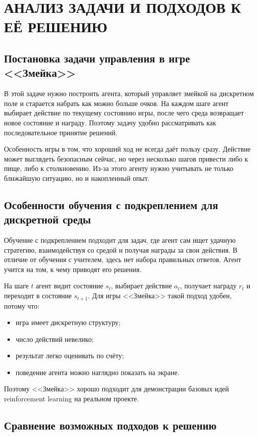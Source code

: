 \chapter{АНАЛИЗ ЗАДАЧИ И ПОДХОДОВ К ЕЁ РЕШЕНИЮ}

\section{Постановка задачи управления в игре <<Змейка>>}

В этой задаче нужно построить агента, который управляет змейкой на дискретном поле и старается набрать как можно больше очков. На каждом шаге агент выбирает действие по текущему состоянию игры, после чего среда возвращает новое состояние и награду. Поэтому задачу удобно рассматривать как последовательное принятие решений.

Особенность игры в том, что хороший ход не всегда даёт пользу сразу. Действие может выглядеть безопасным сейчас, но через несколько шагов привести либо к пище, либо к столкновению. Из-за этого агенту нужно учитывать не только ближайшую ситуацию, но и накопленный опыт.

\section{Особенности обучения с подкреплением для дискретной среды}

Обучение с подкреплением подходит для задач, где агент сам ищет удачную стратегию, взаимодействуя со средой и получая награды за свои действия. В отличие от обучения с учителем, здесь нет набора правильных ответов. Агент учится на том, к чему приводят его решения.

На шаге $t$ агент видит состояние $s_t$, выбирает действие $a_t$, получает награду $r_t$ и переходит в состояние $s_{t+1}$. Для игры <<Змейка>> такой подход удобен, потому что:
\begin{itemize}
    \item игра имеет дискретную структуру;
    \item число действий невелико;
    \item результат легко оценивать по счёту;
    \item поведение агента можно наглядно показать на экране.
\end{itemize}

Поэтому <<Змейка>> хорошо подходит для демонстрации базовых идей reinforcement learning на реальном проекте.

\section{Сравнение возможных подходов к решению}


